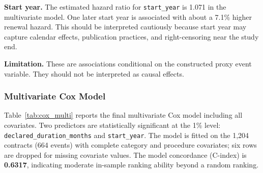 \documentclass[12pt, a4paper]{article}
\begin{document}
\textbf{Start year.} The estimated hazard ratio for \texttt{start\_year} is
1.071 in the multivariate model. One later start year is associated with about
a 7.1\% higher renewal hazard. This should be interpreted cautiously because start year may capture
calendar effects, publication practices, and right-censoring near the study
end.

\textbf{Limitation.} These are associations conditional on the constructed
proxy event variable. They should not be interpreted as causal effects.

\subsubsection*{Multivariate Cox Model}

Table~\ref{tab:cox_multi} reports the final multivariate Cox model including
all covariates. Two predictors are statistically significant at the 1\% level:
\texttt{declared\_duration\_months} and \texttt{start\_year}. The model is fitted
on the 1,204 contracts (664 events) with complete category and procedure
covariates; six rows are dropped for missing covariate values. The model
concordance (C-index) is \textbf{0.6317}, indicating moderate in-sample ranking
ability beyond a random ranking.
\end{document}
